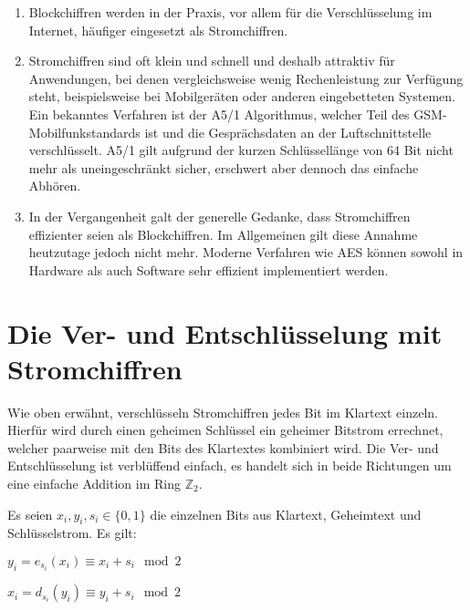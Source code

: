 \begin{enumerate}[itemsep = 0pt]
  \item Blockchiffren werden in der Praxis, vor allem für die Verschlüsselung im Internet,
        häufiger eingesetzt als Stromchiffren.
  \item Stromchiffren sind oft klein und schnell und deshalb attraktiv für Anwendungen,
        bei denen vergleichsweise wenig Rechenleistung zur Verfügung steht, beispielsweise bei
        Mobilgeräten oder anderen eingebetteten Systemen. Ein bekanntes Verfahren ist der
        A5/1 Algorithmus, welcher Teil des GSM-Mobilfunkstandards ist und die Gesprächsdaten
        an der Luftschnittstelle verschlüsselt. A5/1 gilt aufgrund der kurzen Schlüssellänge von
        64 Bit nicht mehr als uneingeschränkt sicher, erschwert aber dennoch das einfache Abhören.
  \item In der Vergangenheit galt der generelle Gedanke, dass Stromchiffren
        effizienter seien als Blockchiffren.
        Im Allgemeinen gilt diese Annahme heutzutage jedoch nicht mehr. Moderne Verfahren wie AES
        können sowohl in Hardware als auch Software sehr effizient implementiert werden.
\end{enumerate}

\newpage
\section{Die Ver- und Entschlüsselung mit Stromchiffren}
Wie oben erwähnt, verschlüsseln Stromchiffren jedes Bit im Klartext einzeln. Hierfür
wird durch einen geheimen Schlüssel ein geheimer Bitstrom errechnet, welcher paarweise mit den Bits
des Klartextes kombiniert wird. Die Ver- und Entschlüsselung ist verblüffend einfach, es handelt
sich in beide Richtungen um eine einfache Addition im Ring $\mathbb{Z}_2$.

\begin{definition}
  Es seien $x_i,y_i,s_i \in \{0,1\}$ die einzelnen Bits aus Klartext, Geheimtext und Schlüs\-selstrom.
  Es gilt:
  \begin{description}[itemsep = 0pt]
    \item[Verschlüsselung:] $y_i = e_{s_i}(x_i) \equiv x_i + s_i \mod{2}$
    \item[Entschlüsselung:] $x_i = d_{s_i}(y_i) \equiv y_i + s_i \mod{2}$
  \end{description}
\end{definition}

